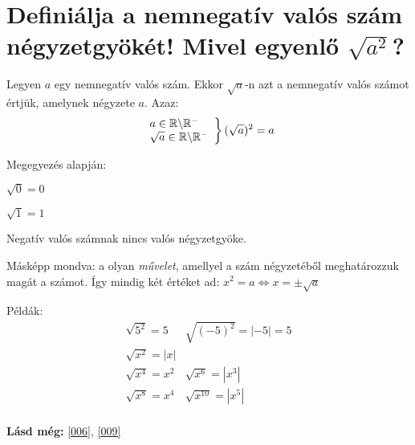 
\section{Definiálja a nemnegatív valós szám négyzetgyökét! Mivel egyenlő
\texorpdfstring{$\sqrt{a^2}$}{sqrt(a**2)}?}
\label{008}

\begin{defin}[Négyzetgyök]
Legyen $a$ egy nemnegatív valós szám. Ekkor $\sqrt{a}$-n azt a nemnegatív valós
számot értjük, amelynek négyzete $a$. Azaz:
\[
\left.
\begin{array}{l}
  a \in \mathbb{R} \backslash \mathbb{R}^-\\
  \sqrt{a} \in \mathbb{R} \backslash \mathbb{R}^-
\end{array}
\right\} 
(\sqrt{a})^2 = a
\]

Megegyezés alapján:

$\sqrt{0} = 0$

$\sqrt{1} = 1$

Negatív valós számnak nincs valós négyzetgyöke.

Másképp mondva: a  olyan \emph{művelet}, amellyel a
szám négyzetéből meghatározzuk magát a számot. Így mindig két értéket ad:
$x^2 = a \Leftrightarrow x = \pm \sqrt{a}$
\end{defin}

Példák:
\[
\begin{array}{l|r}
  \sqrt{5^2} = 5   & \sqrt{(-5)^2} = |-5| = 5\\\hline
  \sqrt{x^2} = |x| & \\\hline
  \sqrt{x^4} = x^2 & \sqrt{x^6} = |x^3|\\\hline
  \sqrt{x^8} = x^4 & \sqrt{x^{10}} = |x^5|\\
\end{array}
\]

\textbf{Lásd még:} \ref{006}, \ref{009}
